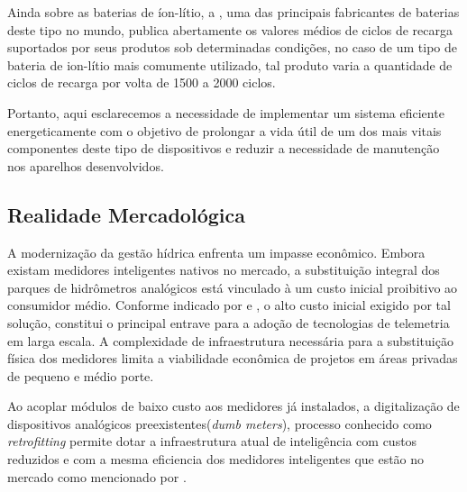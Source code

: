Ainda sobre as baterias de íon-lítio, a , uma das principais fabricantes de baterias deste tipo no mundo, publica abertamente os valores médios de ciclos de recarga suportados por seus produtos sob determinadas condições, no caso de um tipo de bateria de ion-lítio mais comumente utilizado, tal produto varia a quantidade de ciclos de recarga por volta de 1500 a 2000 ciclos.

Portanto, aqui esclarecemos a necessidade de implementar um sistema eficiente energeticamente com o objetivo de prolongar a vida útil de um dos mais vitais componentes deste tipo de dispositivos e reduzir a necessidade de manutenção nos aparelhos desenvolvidos.

\subsection{Realidade Mercadológica}

A modernização da gestão hídrica enfrenta um impasse econômico. Embora existam medidores inteligentes nativos no mercado, a substituição integral dos parques de hidrômetros analógicos está vinculado à um custo inicial proibitivo ao consumidor médio. 
Conforme indicado por  e , o alto custo inicial exigido por tal solução, constitui o principal entrave para a adoção de tecnologias de telemetria em larga escala. 
A complexidade de infraestrutura necessária para a substituição física dos medidores limita a viabilidade econômica de projetos em áreas privadas de pequeno e médio porte.

Ao acoplar módulos de baixo custo aos medidores já instalados, a digitalização de dispositivos analógicos preexistentes(\textit{dumb meters}), processo conhecido como \textit{\gls{retrofitting}} permite dotar a infraestrutura atual de inteligência com custos reduzidos e com a mesma eficiencia dos medidores inteligentes que estão no mercado como mencionado por .